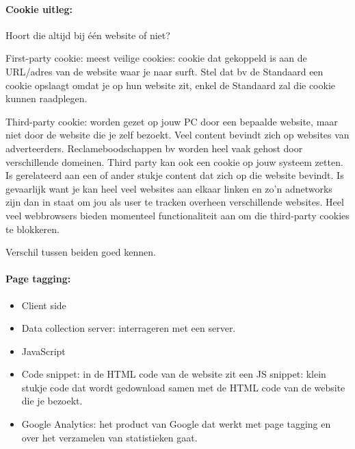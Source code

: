 \documentclass[10pt,a4paper]{report}
\begin{document}
\paragraph{Cookie uitleg:}Hoort die altijd bij één website of niet?
\begin{description}
\item First-party cookie: meest veilige cookies: cookie dat gekoppeld is aan de URL/adres van de website waar je naar surft. Stel dat bv de Standaard een cookie opslaagt omdat je op hun website zit, enkel de Standaard zal die cookie kunnen raadplegen.
\item Third-party cookie: worden gezet op jouw PC door een bepaalde website, maar niet door de website die je zelf bezoekt. Veel content bevindt zich op websites van adverteerders. Reclameboodschappen bv worden heel vaak gehost door verschillende domeinen. Third party kan ook een cookie op jouw systeem zetten. Is gerelateerd aan een of ander stukje content dat zich op die website bevindt. Is gevaarlijk want je kan heel veel websites aan elkaar linken en zo'n adnetworks zijn dan in staat om jou als user te tracken overheen verschillende websites. Heel veel webbrowsers bieden momenteel functionaliteit aan om die third-party cookies te blokkeren.
\end{description}
Verschil tussen beiden goed kennen.

\paragraph{Page tagging:}
\begin{itemize}
\item Client side
\item Data collection server: interrageren met een server.
\item JavaScript
\item Code snippet: in de HTML code van de website zit een JS snippet: klein stukje code dat wordt gedownload samen met de HTML code van de website die je bezoekt.
\item Google Analytics: het product van Google dat werkt met page tagging en over het verzamelen van statistieken gaat.
\end{itemize}
\end{document}
